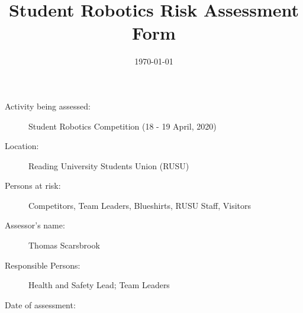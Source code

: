 \documentclass[12pt,a4paper]{scrartcl}
\title{Student Robotics Risk Assessment Form}
\begin{document}
\maketitle

\begin{description}
\item[Activity being assessed:] Student Robotics Competition (18 - 19 April, 2020)
\item[Location:] Reading University Students Union (RUSU)
\item[Persons at risk:] Competitors, Team Leaders, Blueshirts, RUSU Staff, Visitors
\end{description}

\begin{description}
\item[Assessor's name:] Thomas Scarsbrook
\item[Responsible Persons:] Health and Safety Lead; Team Leaders
\item[Date of assessment:] \date{\today}
\end{description}
\clearpage

\newcommand{\risk}[4]{
 #1 & #2 & #3 & #4 \\
}
\end{document}
